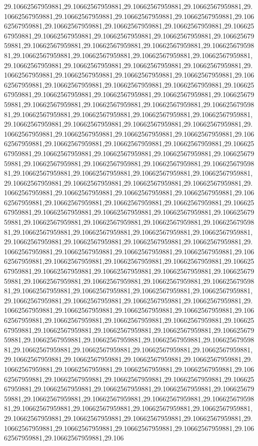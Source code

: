 29.10662567959881,29.10662567959881,29.10662567959881,29.10662567959881,29.10662567959881,29.10662567959881,29.10662567959881,29.10662567959881,29.10662567959881,29.10662567959881,29.10662567959881,29.10662567959881,29.10662567959881,29.10662567959881,29.10662567959881,29.10662567959881,29.10662567959881,29.10662567959881,29.10662567959881,29.10662567959881,29.10662567959881,29.10662567959881,29.10662567959881,29.10662567959881,29.10662567959881,29.10662567959881,29.10662567959881,29.10662567959881,29.10662567959881,29.10662567959881,29.10662567959881,29.10662567959881,29.10662567959881,29.10662567959881,29.10662567959881,29.10662567959881,29.10662567959881,29.10662567959881,29.10662567959881,29.10662567959881,29.10662567959881,29.10662567959881,29.10662567959881,29.10662567959881,29.10662567959881,29.10662567959881,29.10662567959881,29.10662567959881,29.10662567959881,29.10662567959881,29.10662567959881,29.10662567959881,29.10662567959881,29.10662567959881,29.10662567959881,29.10662567959881,29.10662567959881,29.10662567959881,29.10662567959881,29.10662567959881,29.10662567959881,29.10662567959881,29.10662567959881,29.10662567959881,29.10662567959881,29.10662567959881,29.10662567959881,29.10662567959881,29.10662567959881,29.10662567959881,29.10662567959881,29.10662567959881,29.10662567959881,29.10662567959881,29.10662567959881,29.10662567959881,29.10662567959881,29.10662567959881,29.10662567959881,29.10662567959881,29.10662567959881,29.10662567959881,29.10662567959881,29.10662567959881,29.10662567959881,29.10662567959881,29.10662567959881,29.10662567959881,29.10662567959881,29.10662567959881,29.10662567959881,29.10662567959881,29.10662567959881,29.10662567959881,29.10662567959881,29.10662567959881,29.10662567959881,29.10662567959881,29.10662567959881,29.10662567959881,29.10662567959881,29.10662567959881,29.10662567959881,29.10662567959881,29.10662567959881,29.10662567959881,29.10662567959881,29.10662567959881,29.10662567959881,29.10662567959881,29.10662567959881,29.10662567959881,29.10662567959881,29.10662567959881,29.10662567959881,29.10662567959881,29.10662567959881,29.10662567959881,29.10662567959881,29.10662567959881,29.10662567959881,29.10662567959881,29.10662567959881,29.10662567959881,29.10662567959881,29.10662567959881,29.10662567959881,29.10662567959881,29.10662567959881,29.10662567959881,29.10662567959881,29.10662567959881,29.10662567959881,29.10662567959881,29.10662567959881,29.10662567959881,29.10662567959881,29.10662567959881,29.10662567959881,29.10662567959881,29.10662567959881,29.10662567959881,29.10662567959881,29.10662567959881,29.10662567959881,29.10662567959881,29.10662567959881,29.10662567959881,29.10662567959881,29.10662567959881,29.10662567959881,29.10662567959881,29.10662567959881,29.10662567959881,29.10662567959881,29.10662567959881,29.10662567959881,29.10662567959881,29.10662567959881,29.10662567959881,29.10662567959881,29.10662567959881,29.10662567959881,29.10662567959881,29.10662567959881,29.10662567959881,29.10662567959881,29.10662567959881,29.10662567959881,29.10662567959881,29.10662567959881,29.10662567959881,29.10662567959881,29.10662567959881,29.10662567959881,29.10662567959881,29.10662567959881,29.10662567959881,29.10662567959881,29.10662567959881,29.10662567959881,29.10662567959881,29.10662567959881,29.10662567959881,29.10662567959881,29.106